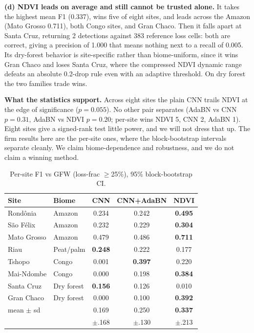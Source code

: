 \documentclass[journal]{IEEEtran}
\begin{document}
\textbf{(d) NDVI leads on average and still cannot be trusted alone.} It takes the
highest mean F1 (0.337), wins five of eight sites, and leads across the Amazon
(Mato Grosso 0.711), both Congo sites, and Gran Chaco. Then it falls apart at Santa
Cruz, returning 2 detections against 383 reference loss cells: both are correct,
giving a precision of 1.000 that means nothing next to a recall of 0.005. Its
dry-forest behavior is site-specific rather than biome-uniform, since it wins Gran
Chaco and loses Santa Cruz, where the compressed NDVI dynamic range defeats an
absolute 0.2-drop rule even with an adaptive threshold. On dry forest the two
families trade wins.

\textbf{What the statistics support.} Across eight sites the plain CNN trails NDVI
at the edge of significance ($p{=}0.055$). No other pair separates (AdaBN vs CNN
$p{=}0.31$, AdaBN vs NDVI $p{=}0.20$; per-site wins NDVI 5, CNN 2, AdaBN 1). Eight
sites give a signed-rank test little power, and we will not dress that up. The firm
results here are the per-site ones, where the block-bootstrap intervals separate
cleanly. We claim biome-dependence and robustness, and we do not claim a winning
method.

\begin{table}[!t]
\caption{Per-site F1 vs GFW (loss-frac $\geq$25\%), 95\% block-bootstrap CI.}
\label{tab:crossbiome}
\centering
\begin{tabular}{llccc}
\toprule
Site & Biome & CNN & CNN+AdaBN & NDVI \\
\midrule
Rond\^onia & Amazon & 0.234 & 0.242 & \textbf{0.495} \\
S\~ao F\'elix & Amazon & 0.232 & 0.229 & \textbf{0.304} \\
Mato Grosso & Amazon & 0.479 & 0.486 & \textbf{0.711} \\
Riau & Peat/palm & \textbf{0.248} & 0.222 & 0.177 \\
Tshopo & Congo & 0.001 & \textbf{0.397} & 0.220 \\
Mai-Ndombe & Congo & 0.000 & 0.198 & \textbf{0.384} \\
Santa Cruz & Dry forest & \textbf{0.156} & 0.126 & 0.010 \\
Gran Chaco & Dry forest & 0.000 & 0.100 & \textbf{0.392} \\
\midrule
mean $\pm$ sd & & 0.169 & 0.250 & \textbf{0.337} \\
              & & $\pm$.168 & $\pm$.130 & $\pm$.213 \\
\bottomrule
\end{tabular}
\end{table}
\end{document}
